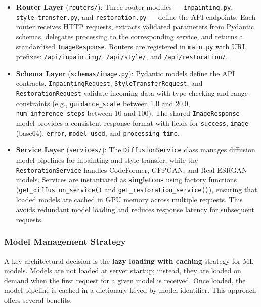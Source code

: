 \documentclass[12pt,a4paper]{report}
\begin{document}
\begin{itemize}
    \item \textbf{Router Layer} (\texttt{routers/}): Three router modules --- \texttt{inpainting.py}, \texttt{style\_\allowbreak{}transfer.py}, and \texttt{restoration.py} --- define the API endpoints. Each router receives HTTP requests, extracts validated parameters from Pydantic schemas, delegates processing to the corresponding service, and returns a standardised \texttt{Image\-Response}. Routers are registered in \texttt{main.py} with URL prefixes: \texttt{/api/\allowbreak{}inpainting/}, \texttt{/api/\allowbreak{}style/}, and \texttt{/api/\allowbreak{}restoration/}.

    \item \textbf{Schema Layer} (\texttt{schemas/\allowbreak{}image.py}): Pydantic models define the API contracts. \texttt{Inpainting\-Request}, \texttt{Style\-Transfer\-Request}, and \texttt{Restoration\-Request} validate incoming data with type checking and range constraints (e.g., \texttt{guidance\_\allowbreak{}scale} between 1.0 and 20.0, \texttt{num\_\allowbreak{}inference\_\allowbreak{}steps} between 10 and 100). The shared \texttt{Image\-Response} model provides a consistent response format with fields for \texttt{success}, \texttt{image} (base64), \texttt{error}, \texttt{model\_used}, and \texttt{processing\_\allowbreak{}time}.

    \item \textbf{Service Layer} (\texttt{services/}): The \texttt{Diffusion\-Service} class manages diffusion model pipelines for inpainting and style transfer, while the \texttt{Restoration\-Service} handles CodeFormer, GFPGAN, and Real-ESRGAN models. Services are instantiated as \textbf{singletons} using factory functions (\texttt{get\_diffusion\_service()} and \texttt{get\_restoration\_service()}), ensuring that loaded models are cached in GPU memory across multiple requests. This avoids redundant model loading and reduces response latency for subsequent requests.
\end{itemize}

\subsubsection{Model Management Strategy}

A key architectural decision is the \textbf{lazy loading with caching} strategy for ML models. Models are not loaded at server startup; instead, they are loaded on demand when the first request for a given model is received. Once loaded, the model pipeline is cached in a dictionary keyed by model identifier. This approach offers several benefits:
\end{document}
